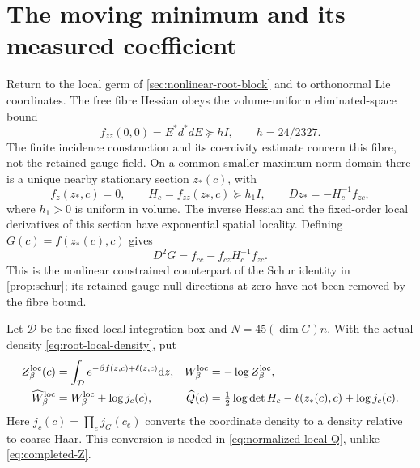 \documentclass[11pt,oneside,openany]{book}
\theoremstyle{definition}
\theoremstyle{remark}
\newcommand{\dd}{\mathrm d}
\newcommand{\src}[2]{\cite[#2]{#1}}
\begin{document}
\section{The moving minimum and its measured coefficient}
\label{sec:actual-one-loop}
Return to the local germ of \cref{sec:nonlinear-root-block} and to
orthonormal Lie coordinates. The free fibre Hessian obeys the
volume-uniform eliminated-space bound
\[
 f_{zz}(0,0)=E^*d^*dE\succeq hI,\qquad h=24/2327.
\]
The finite incidence construction and its coercivity estimate concern
this fibre, not the retained gauge field. On a common smaller
maximum-norm domain there is a unique nearby stationary section
$z_*(c)$, with
\begin{equation}\label{eq:moving-minimum}
 f_z(z_*,c)=0,\qquad H_c=f_{zz}(z_*,c)\succeq h_1I,\qquad
 D z_*=-H_c^{-1}f_{zc},
\end{equation}
where $h_1>0$ is uniform in volume. The inverse Hessian and the
fixed-order local derivatives of this section have exponential spatial
locality. Defining $G(c)=f(z_*(c),c)$ gives
\begin{equation}\label{eq:minimized-Schur}
 D^2G=f_{cc}-f_{cz}H_c^{-1}f_{zc}.
\end{equation}
This is the nonlinear constrained counterpart of the Schur identity
in \cref{prop:schur}; its retained gauge null directions at zero have
not been removed by the fibre bound. \src{F11}{V66, V80--V81}

Let $\mathcal D$ be the fixed local integration box and
$N=45(\dim G)n$. With the actual density \cref{eq:root-local-density},
put
\begin{align}
 Z_\beta^{\rm loc}(c)&=\int_{\mathcal D}
                e^{-\beta f(z,c)+\ell(z,c)}\dd z,
     &W_\beta^{\rm loc}&=-\log Z_\beta^{\rm loc},\notag\\
 \widehat W_\beta^{\rm loc}&=W_\beta^{\rm loc}+\log j_c(c),
     &\widehat Q(c)&=\tfrac12\log\det H_c-\ell(z_*(c),c)
                                     +\log j_c(c).
 \label{eq:normalized-local-Q}
\end{align}
Here $j_c(c)=\prod_ej_G(c_e)$ converts the coordinate density to a
density relative to coarse Haar. This conversion is needed in
\cref{eq:normalized-local-Q}, unlike \cref{eq:completed-Z}.
\end{document}
